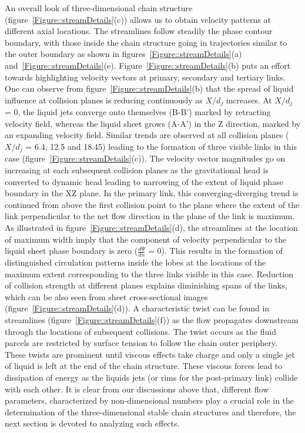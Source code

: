 \documentclass{jfm}
\begin{document}
An overall look of three-dimensional chain structure (figure~\ref{Figure::streamDetails}(c)) allows us to obtain velocity patterns at different axial locations. The streamlines follow steadily the phase contour boundary, with those inside the chain structure going in trajectories similar to the outer boundary as shown in figures~\ref{Figure::streamDetails}(a) and~\ref{Figure::streamDetails}(e). Figure~\ref{Figure::streamDetails}(b) puts an effort towards highlighting velocity vectors at primary, secondary and tertiary links. One can observe from figure~\ref{Figure::streamDetails}(b) that the spread of liquid influence at collision planes is reducing continuously as $X/d_j$ increases.  At $X/d_j$ = 0, the liquid jets converge onto themselves (B-B') marked by retracting velocity field, whereas the liquid sheet grows (A-A') in the Z direction, marked by an expanding velocity field. Similar trends are observed at all collision planes ($X/d_j$ = 6.4, 12.5 and 18.45) leading to the formation of three visible links in this case (figure~\ref{Figure::streamDetails}(c)). The velocity vector magnitudes go on increasing at each subsequent collision planes as the gravitational head is converted to dynamic head leading to narrowing of the extent of liquid phase boundary in the XZ plane. In the primary link, this converging-diverging trend is continued from above the first collision point to the plane where the extent of the link perpendicular to the net flow direction in the plane of the link is maximum. As illustrated in figure~\ref{Figure::streamDetails}(d), the streamlines at the location of maximum width imply that the component of velocity perpendicular to the liquid sheet phase boundary is zero ($\frac{d\Psi}{dn}$ = 0). This results in the formation of distinguished circulation patterns inside the lobes at the locations of the maximum extent corresponding to the three links visible in this case. Reduction of collision strength at different planes explains diminishing spans of the links, which can be also seen from sheet cross-sectional images (figure~\ref{Figure::streamDetails}(d)). A characteristic twist can be found in streamlines (figure~\ref{Figure::streamDetails}(f)) as the flow propagates downstream through the locations of subsequent collisions. The twist occurs as the fluid parcels are restricted by surface tension to follow the chain outer periphery. These twists are prominent until viscous effects take charge and only a single jet of liquid is left at the end of the chain structure. These viscous forces lead to dissipation of energy as the liquids jets (or rims for the post-primary link) collide with each other. It is clear from our discussions above that, different flow parameters, characterized by non-dimensional numbers play a crucial role in the determination of the three-dimensional stable chain structures and therefore, the next section is devoted to analyzing such effects.
\end{document}
